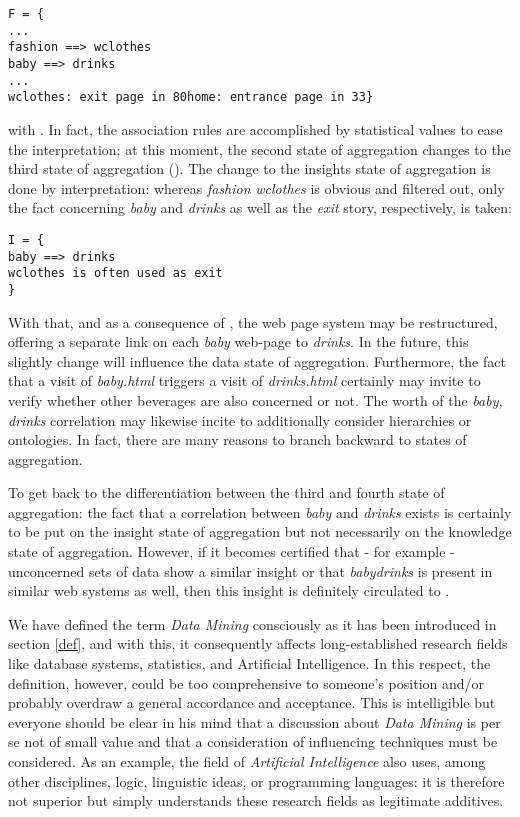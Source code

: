 \documentclass[10pt,latex8]{article}
\begin{document}
{\small
\begin{verbatim}
F = {
...
fashion ==> wclothes
baby ==> drinks
...
wclothes: exit page in 80home: entrance page in 33}
\end{verbatim}
}
with . In fact, the association rules are accomplished by statistical values to ease the interpretation; at this moment, the second state of aggregation changes to the third state of aggregation (). The change to the insights state of aggregation is done by interpretation: whereas \textit{fashion}  \textit{wclothes} is obvious and filtered out, only the fact concerning \textit{baby} and \textit{drinks} as well as the \textit{exit} story, respectively, is taken:

{\small
\begin{verbatim}
I = {
baby ==> drinks
wclothes is often used as exit 
}
\end{verbatim}
}
With that, and as a consequence of , the web page system may be restructured, offering a separate link on each \textit{baby} web-page to \textit{drinks}. In the future, this slightly change will influence the data state of aggregation. Furthermore, the fact that a visit of \textit{baby.html} triggers a visit of \textit{drinks.html} certainly may invite to verify whether other beverages are also concerned or not. The worth of the \textit{baby, drinks} correlation may likewise incite to additionally consider hierarchies or ontologies. In fact, there are many reasons to branch backward to states of aggregation.

To get back to the differentiation between the third and fourth state of aggregation: the fact that a correlation between \textit{baby} and \textit{drinks} exists is certainly to be put on the insight state of aggregation but not necessarily on the knowledge state of aggregation. However, if it becomes certified that - for example - unconcerned sets of data show a similar insight or that \textit{baby}\textit{drinks} is present in similar web systems as well, then this insight is definitely circulated to .

We have defined the term \textit{Data Mining} consciously as it has been introduced in section \ref{def}, and with this, it consequently affects long-established research fields like database systems, statistics, and Artificial Intelligence. In this respect, the definition, however, could be too comprehensive to someone's position and/or probably overdraw a general accordance and acceptance. This is intelligible but everyone should be clear in his mind that a discussion about \textit{Data Mining} is per se not of small value and that a consideration of influencing techniques must be considered. As an example, the field of \textit{Artificial Intelligence} also uses, among other disciplines, logic, linguistic ideas, or programming languages: it is therefore not superior but simply understands these research fields as legitimate additives.
\end{document}
